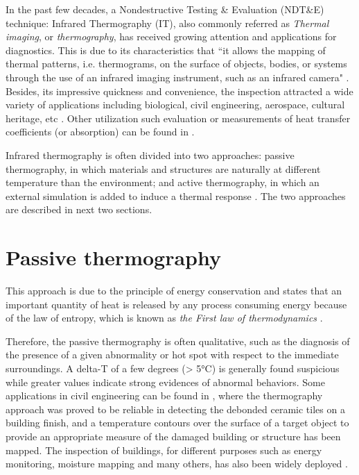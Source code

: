In the past few decades, a Nondestructive Testing \& Evaluation (NDT\&E) technique: Infrared Thermography (IT), also commonly referred as \textit{Thermal imaging}, or \textit{thermography}, has received growing attention and applications for diagnostics. This is due to its characteristics that ``it allows the mapping of thermal patterns, i.e. thermograms, on the surface of objects, bodies, or systems through the use of an infrared imaging instrument, such as an infrared camera" \citep{maldague3introduction}. Besides, its impressive quickness and convenience, the inspection attracted a wide variety of applications including biological, civil engineering, aerospace, cultural heritage, etc \citep{2007-Ibarra-Castanedo,2000-Li,cielo1987thermographie,shoja2011inspection,pradere2009microscale,avdelidis2004applications,maierhofer2005quantitative}. Other utilization such evaluation or measurements of heat transfer coefficients (or absorption) can be found in \citep{dragano2009experimental,grinzato2010r,grinzatoquality,grinzato1comparison,rossi2009k}.

Infrared thermography is often divided into two approaches: passive thermography, in which materials and structures are naturally at different temperature than the environment; and active thermography, in which an external simulation is added to induce a thermal response \citep{Maldague2001theory}. The two approaches are described in next two sections.
\section{Passive thermography}
This approach is due to the principle of energy conservation and states that an important quantity of heat is released by any process consuming energy because of the law of entropy, which is known as \textit{the First law of thermodynamics} \citep{thdy1}. 

Therefore, the passive thermography is often qualitative, such as the diagnosis of the presence of a given abnormality or hot spot with respect to the immediate surroundings.  A delta-T of a few degrees (> 5°C) is generally
found suspicious while greater values indicate strong evidences of abnormal behaviors. Some applications in civil engineering can be found in \citep{2000-Li,stanley1994non,lo2004building}, where the thermography approach was proved to be reliable in detecting the debonded ceramic tiles on a building finish, and a temperature contours over the surface of a target object to provide an appropriate measure of the damaged building or structure has been mapped. The inspection of buildings, for different purposes such as energy monitoring, moisture mapping and many others, has also been widely deployed \citep{laranjeirapassive,bison1993automatic,bison2012geometrical}. 

